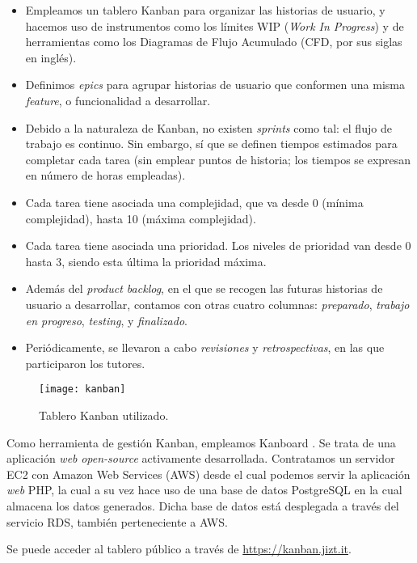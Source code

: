 \begin{itemize}
	\item [\textbullet] Empleamos un tablero Kanban para organizar las historias de usuario, y hacemos uso de instrumentos como los límites WIP (\emph{Work In Progress}) y de herramientas como los Diagramas de Flujo Acumulado (CFD, por sus siglas en inglés).
	\item [\textbullet] Definimos \emph{epics} para agrupar historias de usuario que conformen una misma \emph{feature}, o funcionalidad a desarrollar.
	\item [\textbullet] Debido a la naturaleza de Kanban, no existen \emph{sprints} como tal: el flujo de trabajo es continuo. Sin embargo, sí que se definen tiempos estimados para completar cada tarea (sin emplear puntos de historia; los tiempos se expresan en número de horas empleadas).
	\item [\textbullet] Cada tarea tiene asociada una complejidad, que va desde 0 (mínima complejidad), hasta 10 (máxima complejidad).
	\item [\textbullet] Cada tarea tiene asociada una prioridad. Los niveles de prioridad van desde 0 hasta 3, siendo esta última la prioridad máxima.
	\item [\textbullet] Además del \emph{product backlog}, en el que se recogen las futuras historias de usuario a desarrollar, contamos con otras cuatro columnas: \emph{preparado}, \emph{trabajo en progreso}, \emph{testing}, y \emph{finalizado}.
	\item [\textbullet] Periódicamente, se llevaron a cabo \emph{revisiones} y \emph{retrospectivas}, en las que participaron los tutores.
\end{itemize}

\vspace{-0.2cm}
\begin{figure}[h]
	\centering
	\texttt{[image: kanban]}
	\caption{Tablero Kanban utilizado.}
\end{figure}

Como herramienta de gestión Kanban, empleamos Kanboard \cite{kanboard}. Se trata de una aplicación \emph{web} \emph{open-source} activamente desarrollada. Contratamos un servidor EC2 con Amazon Web Services (AWS) desde el cual podemos servir la aplicación \emph{web} PHP, la cual a su vez hace uso de una base de datos PostgreSQL en la cual almacena los datos generados. Dicha base de datos está desplegada a través del servicio RDS, también perteneciente a AWS.

Se puede acceder al tablero público a través de \href{https://web.archive.org/web/20210224162004/https://board.jizt.it/public/board/c08ea3322e2876652a0581e79d6430e2dc0c27720d8a06d7853e84c3cd2b}{https://kanban.jizt.it}.

